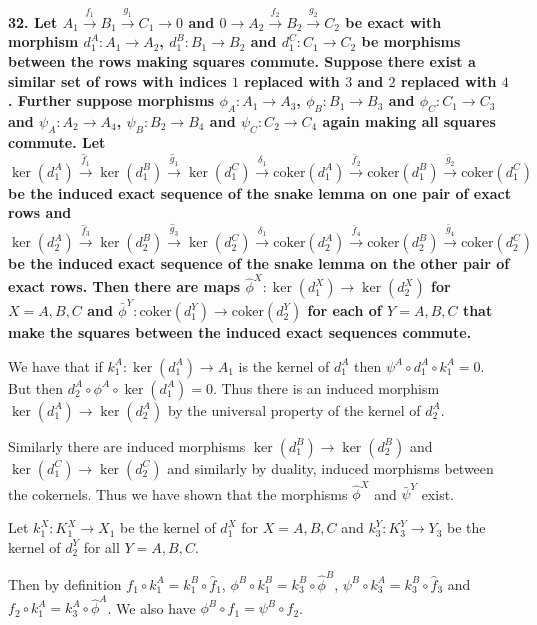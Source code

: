 \documentclass[12pt]{article}
\begin{document}
\textbf{32. Let $A_1 \overset{f_1}{\rightarrow} B_1 \overset{g_1}{\rightarrow} C_1 \rightarrow 0$ and $0 \rightarrow A_2 \overset{f_2}{\rightarrow} B_2 \overset{g_2}{\rightarrow} C_2$ be exact with morphism $d_1^A : A_1 \to A_2$, $d_1^B : B_1 \to B_2$ and $d_1^C : C_1 \to C_2$ be morphisms between the rows making squares commute. Suppose there exist a similar set of rows with indices $1$ replaced with $3$ and $2$ replaced with $4$. Further suppose morphisms $\phi_A : A_1 \to A_3$, $\phi_B : B_1 \to B_3$ and $\phi_C : C_1 \to C_3$ and $\psi_A : A_2 \to A_4$, $\psi_B : B_2 \to B_4$ and $\psi_C : C_2 \to C_4$ again making all squares commute. Let $\ker(d_1^A) \overset{\hat{f}_1}{\rightarrow} \ker(d_1^B) \overset{\hat{g}_1}{\rightarrow} \ker(d_1^C) \overset{\delta_1}{\rightarrow} \mbox{coker}(d_1^A) \overset{\bar{f}_2}{\rightarrow} \mbox{coker}(d_1^B) \overset{\bar{g}_2}{\rightarrow} \mbox{coker}(d_1^C)$ be the induced exact sequence of the snake lemma on one pair of exact rows and $\ker(d_2^A) \overset{\hat{f}_3}{\rightarrow} \ker(d_2^B) \overset{\hat{g}_3}{\rightarrow} \ker(d_2^C) \overset{\delta_1}{\rightarrow} \mbox{coker}(d_2^A) \overset{\bar{f}_4}{\rightarrow} \mbox{coker}(d_2^B) \overset{\bar{g}_4}{\rightarrow} \mbox{coker}(d_2^C)$ be the induced exact sequence of the snake lemma on the other pair of exact rows. Then there are maps $\hat{\phi}^X : \ker(d_1^X) \to \ker(d_2^X)$ for $X = A, B, C$ and $\bar{\phi}^Y : \mbox{coker}(d_1^Y) \to \mbox{coker}(d_2^Y)$ for each of $Y = A, B, C$ that make the squares between the induced exact sequences commute.}

We have that if $k_1^A : \ker(d_1^A) \to A_1$ is the kernel of $d_1^A$ then $\psi^A\circ d_1^A\circ k_1^A = 0$. But then $d_2^A\circ \phi^A\circ \ker(d_1^A) = 0$. Thus there is an induced morphism  $\ker(d_1^A) \to \ker(d_2^A)$ by the universal property of the kernel of $d_2^A$.

Similarly there are induced morphisms $\ker(d_1^B) \to \ker(d_2^B)$ and $\ker(d_1^C) \to \ker(d_2^C)$ and similarly by duality, induced morphisms between the cokernels. Thus we have shown that the morphisms $\hat{\phi}^X$ and $\bar{\psi}^Y$ exist.

Let $k_1^X : K_1^X \to X_1$ be the kernel of $d_1^X$ for $X = A, B, C$ and $k_3^Y : K_3^Y \to Y_3$ be the kernel of $d_2^Y$ for all $Y = A, B, C$.

Then by definition $f_1\circ k_1^A = k_1^B\circ \hat{f}_1$, $\phi^B\circ k_1^B = k_3^B\circ \hat{\phi}^B$, $\psi^B\circ k_3^A = k_3^B\circ \hat{f}_3$ and $f_2\circ k_1^A = k_3^A\circ \hat{\phi}^A$. We also have $\phi^B\circ f_1 = \psi^B\circ f_2$.
\end{document}
